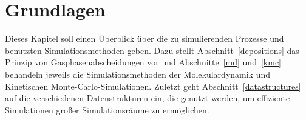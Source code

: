 \chapter{Grundlagen}
\label{theory}

Dieses Kapitel soll einen Überblick über die zu simulierenden Prozesse und benutzten Simulationsmethoden geben.
Dazu stellt Abschnitt~\ref{depositions} das Prinzip von Gasphasenabscheidungen vor und Abschnitte~\ref{md} und~\ref{kmc} behandeln jeweils die Simulationsmethoden der Molekulardynamik und Kinetischen Monte-Carlo-Simulationen.
Zuletzt geht Abschnitt~\ref{datastructures} auf die verschiedenen Datenstrukturen ein, die genutzt werden, um effiziente Simulationen großer Simulationsräume zu ermöglichen.


\clearpage

\clearpage

\clearpage

